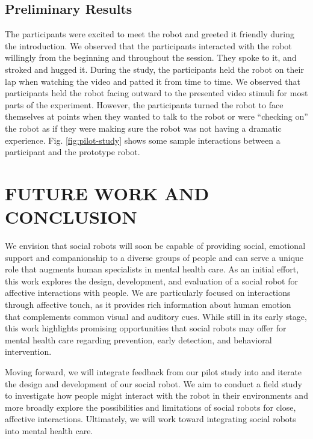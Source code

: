 \documentclass[letterpaper, 10 pt, conference]{ieeeconf}  %
\begin{document}

\subsection{Preliminary Results}
The participants were excited to meet the robot and greeted it friendly during the introduction.
We observed that the participants interacted with the robot willingly from the beginning and throughout the session. They spoke to it, and stroked and hugged it. During the study, the participants held the robot on their lap when watching the video and patted it from time to time. We observed that participants held the robot facing outward to the presented video stimuli for most parts of the experiment. However, the participants turned the robot to face themselves at points when they wanted to talk to the robot or were ``checking on'' the robot as if they were making sure the robot was not having a dramatic experience. Fig. \ref{fig:pilot-study} shows some sample interactions between a participant and the prototype robot. 

\section{FUTURE WORK AND CONCLUSION}
We envision that social robots will soon be capable of providing social, emotional support and companionship to a diverse groups of people and can serve a unique role that augments human specialists in mental health care. As an initial effort, this work explores the design, development, and evaluation of a social robot for affective interactions with people. We are particularly focused on interactions through affective touch, as it provides rich information about human emotion that complements common visual and auditory cues. While still in its early stage, this work highlights promising opportunities that social robots may offer for mental health care regarding prevention, early detection, and behavioral intervention.

Moving forward, we will integrate feedback from our pilot study into and iterate the design and development of our social robot. We aim to conduct a field study to investigate how people might interact with the robot in their environments and more broadly explore the possibilities and limitations of social robots for close, affective interactions. Ultimately, we will work toward integrating social robots into mental health care.
\end{document}
